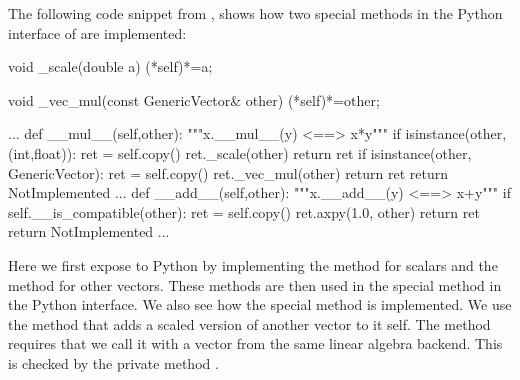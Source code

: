 The following code snippet from , shows how two special methods in the Python interface of  are implemented:
\begin{c++}
  void _scale(double a)
  {(*self)*=a;}

  void _vec_mul(const GenericVector& other)
  {(*self)*=other;}

   ...
    def __mul__(self,other):
        """x.__mul__(y) <==> x*y"""
        if isinstance(other,(int,float)):
            ret = self.copy()
            ret._scale(other)
            return ret
        if isinstance(other, GenericVector):
            ret = self.copy()
            ret._vec_mul(other)
            return ret
        return NotImplemented
    ...
    def __add__(self,other):
        """x.__add__(y) <==> x+y"""
        if self.__is_compatible(other):
            ret = self.copy()
            ret.axpy(1.0, other)
            return ret
        return NotImplemented
   ...
\end{c++}
Here we first expose  to Python by implementing the  method for scalars and the  method for other vectors. These methods are then used in the  special method in the Python interface. We also see how the  special method is implemented. We use the  method that adds a scaled version of another vector to it self. The  method requires that we call it with a vector from the same linear algebra backend. This is checked by the private method .\par

